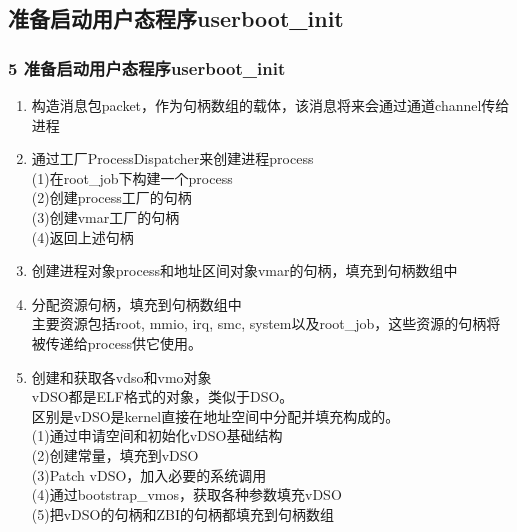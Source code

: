 \documentclass[
8pt, %
]{beamer}
\begin{document}
	\subsection{准备启动用户态程序userboot\_init}

	\begin{frame}
		\frametitle{5 准备启动用户态程序userboot\_init}
		\begin{enumerate}
			\item 构造消息包packet，作为句柄数组的载体，该消息将来会通过通道channel传给进程
			\item 通过工厂ProcessDispatcher来创建进程process\\
			(1)在root\_job下构建一个process\\
			(2)创建process工厂的句柄\\
			(3)创建vmar工厂的句柄\\
			(4)返回上述句柄
			\item 创建进程对象process和地址区间对象vmar的句柄，填充到句柄数组中
			\item 分配资源句柄，填充到句柄数组中\\
			主要资源包括root, mmio, irq, smc, system以及root\_job，这些资源的句柄将被传递给process供它使用。
			\item 创建和获取各vdso和vmo对象\\
			vDSO都是ELF格式的对象，类似于DSO。\\
			区别是vDSO是kernel直接在地址空间中分配并填充构成的。\\
			(1)通过申请空间和初始化vDSO基础结构\\
			(2)创建常量，填充到vDSO\\
			(3)Patch vDSO，加入必要的系统调用\\
			(4)通过bootstrap\_vmos，获取各种参数填充vDSO\\
			(5)把vDSO的句柄和ZBI的句柄都填充到句柄数组
		\end{enumerate}
	\end{frame}
\end{document}
